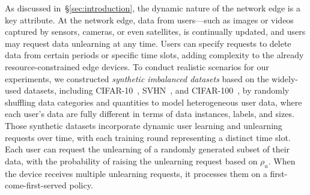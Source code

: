 \documentclass[conference,compsoc]{IEEEtran}
\begin{document}
As discussed in~\S\ref{sec:introduction}, the dynamic nature of the network edge is a key attribute. At the network edge, data from users—such as images or videos captured by sensors, cameras, or even satellites, is continually updated, and users may request data unlearning at any time. Users can specify requests to delete data from certain periods or specific time slots, adding complexity to the already resource-constrained edge devices.
To conduct realistic scenarios for our experiments, we constructed \textit{synthetic imbalanced datasets} based on the widely-used datasets, including CIFAR-10~\cite{krizhevsky2009learning}, SVHN~\cite{netzer2011reading}, and CIFAR-100~\cite{krizhevsky2009learning}, by randomly shuffling data categories and quantities to model heterogeneous user data, where each user's data are fully different 
in terms of data instances, labels, and sizes. Those synthetic datasets incorporate dynamic user learning and unlearning requests over time, with each training round representing a distinct time slot. Each user can request the unlearning of a randomly generated subset of their data, with the probability of raising the unlearning request based on $\rho_{u}$. When the device receives multiple unlearning requests, it processes them on a first-come-first-served policy. 
\end{document}
